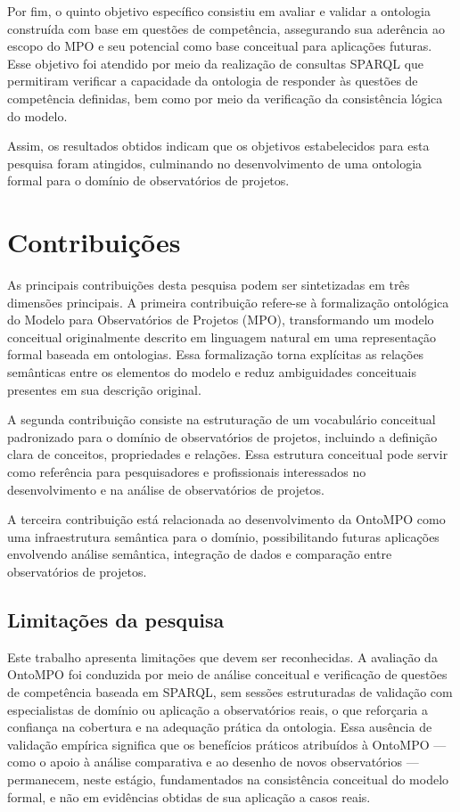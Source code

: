 Por fim, o quinto objetivo específico consistiu em avaliar e validar a ontologia construída com base em questões de competência, assegurando sua aderência ao escopo do MPO e seu potencial como base conceitual para aplicações futuras. Esse objetivo foi atendido por meio da realização de consultas SPARQL que permitiram verificar a capacidade da ontologia de responder às questões de competência definidas, bem como por meio da verificação da consistência lógica do modelo.

Assim, os resultados obtidos indicam que os objetivos estabelecidos para esta pesquisa foram atingidos, culminando no desenvolvimento de uma ontologia formal para o domínio de observatórios de projetos.

\section{Contribuições}

As principais contribuições desta pesquisa podem ser sintetizadas em três dimensões principais. A primeira contribuição refere-se à formalização ontológica do Modelo para Observatórios de Projetos (MPO), transformando um modelo conceitual originalmente descrito em linguagem natural em uma representação formal baseada em ontologias. Essa formalização torna explícitas as relações semânticas entre os elementos do modelo e reduz ambiguidades conceituais presentes em sua descrição original.

A segunda contribuição consiste na estruturação de um vocabulário conceitual padronizado para o domínio de observatórios de projetos, incluindo a definição clara de conceitos, propriedades e relações. Essa estrutura conceitual pode servir como referência para pesquisadores e profissionais interessados no desenvolvimento e na análise de observatórios de projetos.

A terceira contribuição está relacionada ao desenvolvimento da OntoMPO como uma infraestrutura semântica para o domínio, possibilitando futuras aplicações envolvendo análise semântica, integração de dados e comparação entre observatórios de projetos.

\subsection{Limitações da pesquisa}

Este trabalho apresenta limitações que devem ser reconhecidas. A
avaliação da OntoMPO foi conduzida por meio de análise conceitual e
verificação de questões de competência baseada em SPARQL, sem sessões
estruturadas de validação com especialistas de domínio ou aplicação a
observatórios reais, o que reforçaria a confiança na cobertura e na
adequação prática da ontologia. Essa ausência de validação empírica
significa que os benefícios práticos atribuídos à OntoMPO --- como o
apoio à análise comparativa e ao desenho de novos observatórios ---
permanecem, neste estágio, fundamentados na consistência conceitual do
modelo formal, e não em evidências obtidas de sua aplicação a casos
reais.


